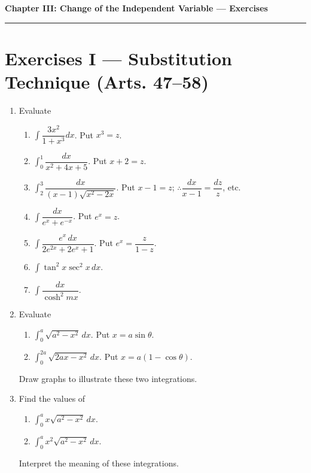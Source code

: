 \documentclass[11pt, a4paper]{article}
\begin{document}
\newpage

\begin{center}
    {\LARGE \bfseries \color{accent} Chapter III: Change of the Independent Variable --- Exercises}\\
    \vspace{0.2cm}
    {\color{accent}\rule{0.55\linewidth}{0.8pt}}
\end{center}
\vspace{0.35cm}

\section*{Exercises I --- Substitution Technique (Arts. 47--58)}

\begin{enumerate}[leftmargin=2em]

\item Evaluate
\begin{enumerate}[label=(\roman*)]
\item $\displaystyle\int \dfrac{3x^2}{1+x^3}dx$. Put $x^3=z$.
\item $\displaystyle\int_0^1 \dfrac{dx}{x^2+4x+5}$. Put $x+2=z$.
\item $\displaystyle\int_2^3 \dfrac{dx}{(x-1)\sqrt{x^2-2x}}$. Put $x-1=z$; $\therefore \dfrac{dx}{x-1}=\dfrac{dz}{z}$, etc.
\item $\displaystyle\int \dfrac{dx}{e^x+e^{-x}}$. Put $e^x=z$.
\item $\displaystyle\int \dfrac{e^x\,dx}{2e^{2x}+2e^x+1}$. Put $e^x=\dfrac{z}{1-z}$.
\item $\displaystyle\int \tan^2x\sec^2x\,dx$.
\item $\displaystyle\int \dfrac{dx}{\cosh^2 mx}$.
\end{enumerate}

\item Evaluate
\begin{enumerate}[label=(\roman*)]
\item $\displaystyle\int_0^a \sqrt{a^2-x^2}\,dx$. Put $x=a\sin\theta$.
\item $\displaystyle\int_0^{2a} \sqrt{2ax-x^2}\,dx$. Put $x=a(1-\cos\theta)$.
\end{enumerate}
Draw graphs to illustrate these two integrations.

\item Find the values of
\begin{enumerate}[label=(\roman*)]
\item $\displaystyle\int_0^a x\sqrt{a^2-x^2}\,dx$.
\item $\displaystyle\int_0^a x^2\sqrt{a^2-x^2}\,dx$.
\end{enumerate}
Interpret the meaning of these integrations.


\end{enumerate}
\end{document}
